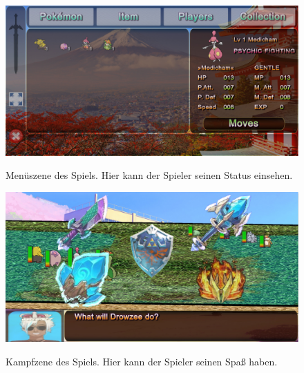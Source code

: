 \documentclass[ngerman,11pt]{report}
\begin{document}
\begin{figure}
\caption{Menüszene des Spiels. Hier kann der Spieler seinen Status einsehen.}
\centering
\includegraphics[width=1.0\textwidth]{screenshot1}
\label{fig:scenemenu}
\end{figure}

\begin{figure}
\caption{Kampfzene des Spiels. Hier kann der Spieler seinen Spaß haben.}
\centering
\includegraphics[width=1.0\textwidth]{screenshot2}
\label{fig:scenemenu}
\end{figure}

\end{document}
